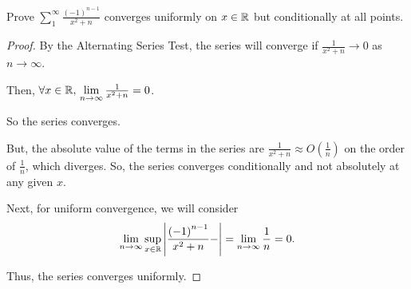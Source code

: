 \documentclass[../hw3]{subfiles}
\begin{document}
\begin{problem}
Prove $\sum_{1}^{\infty}\frac{{(-1)}^{n-1}}{x^2 + n} $  converges uniformly on $x \in  \mathbb{R}$ but conditionally at all points.
\end{problem}
\begin{proof}
	By the Alternating Series Test, the series will converge if $\frac{1}{x^2 + n} \to  0$ as $n\to \infty$.

	Then, $\forall x \in \R,\,  \lim_{n \to \infty} \frac{1}{x^2 + n} = 0$.

	So the series converges.

	But, the absolute value of the terms in the series are $\frac{1}{x^2+n}\approx O\left( \frac{1}{n} \right)$ on the order of $\frac{1}{n}$, which diverges.
	So, the series converges conditionally and not absolutely at any given $x$.

	Next, for uniform convergence, we will consider  \[
		\lim_{n \to \infty} \sup_{x \in \R} \left| \frac{{(-1)}^{n-1}}{x^2 + n} - \right| = \lim_{n \to \infty} \frac{1}{n} = 0
		.\]

	Thus, the series converges uniformly.
\end{proof}
\end{document}
